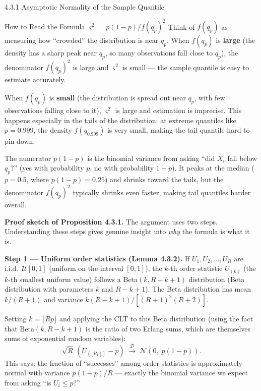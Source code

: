 \documentclass[aspectratio=169,10pt]{beamer}
\begin{document}
\begin{frame}[allowframebreaks]{4.3.1 Asymptotic Normality of the Sample Quantile}
\framebreak

\begin{alertblock}{How to Read the Formula $\varsigma^2 = p(1-p)/f(q_p)^2$}
  Think of $f(q_p)$ as measuring how ``crowded'' the distribution is near
  $q_p$.  When $f(q_p)$ is \textbf{large} (the density has a sharp peak near
  $q_p$, so many observations fall close to $q_p$), the denominator
  $f(q_p)^2$ is large and $\varsigma^2$ is small --- the sample quantile is
  easy to estimate accurately.

  When $f(q_p)$ is \textbf{small} (the distribution is spread out near $q_p$,
  with few observations falling close to it), $\varsigma^2$ is large and
  estimation is imprecise.  This happens especially in the tails of the
  distribution: at extreme quantiles like $p = 0.999$, the density $f(q_{0.999})$
  is very small, making the tail quantile hard to pin down.

  The numerator $p(1-p)$ is the binomial variance from asking ``did $X_i$ fall
  below $q_p$?'' (yes with probability $p$, no with probability $1-p$).  It
  peaks at the median ($p=0.5$, where $p(1-p) = 0.25$) and shrinks toward the
  tails, but the denominator $f(q_p)^2$ typically shrinks even faster, making
  tail quantiles harder overall.
\end{alertblock}

\framebreak

\textbf{Proof sketch of Proposition 4.3.1.}  The argument uses two steps.
Understanding these steps gives genuine insight into \emph{why} the formula is
what it is.

\medskip
\textbf{Step 1 --- Uniform order statistics (Lemma 4.3.2).}
If $U_1, U_2, \ldots, U_R$ are i.i.d.\ $\mathcal{U}[0,1]$ (uniform on the
interval $[0,1]$), the $k$-th order statistic $U_{(k)}$ (the $k$-th smallest
uniform value) follows a Beta$(k, R-k+1)$ distribution (Beta distribution with
parameters $k$ and $R-k+1$).  The Beta distribution has mean $k/(R+1)$ and
variance $k(R-k+1)/[(R+1)^2(R+2)]$.

Setting $k = \lfloor Rp \rfloor$ and applying the CLT to this Beta distribution
(using the fact that $\mathrm{Beta}(k, R-k+1)$ is the ratio of two Erlang sums,
which are themselves sums of exponential random variables):
\[
  \sqrt{R}\,(U_{(\lfloor Rp \rfloor)} - p)
    \;\xrightarrow{\mathcal{D}}\;
    \mathcal{N}(0,\; p(1-p)).
\]
This says: the fraction of ``successes'' among order statistics is approximately
normal with variance $p(1-p)/R$ --- exactly the binomial variance we expect from
asking ``is $U_i \leq p$?''


\end{frame}
\end{document}
